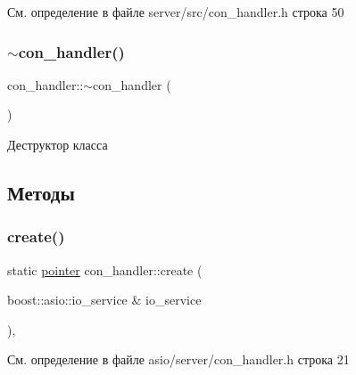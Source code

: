 См. определение в файле server/src/con\+\_\+handler.\+h строка 50

\mbox{\label{classcon__handler_aa1bc82c764eb633355a52bd77689ed3f}} 
\subsubsection{\texorpdfstring{$\sim$con\_handler()}{~con\_handler()}}
{\footnotesize\ttfamily con\+\_\+handler\+::$\sim$con\+\_\+handler (\begin{DoxyParamCaption}{ }\end{DoxyParamCaption})}



Деструктор класса 



\subsection{Методы}
\mbox{\label{classcon__handler_ab3cec40540ef3ff484ef0b639545eb17}} 
\subsubsection{\texorpdfstring{create()}{create()}\hspace{0.1cm}{\footnotesize\ttfamily [1/2]}}
{\footnotesize\ttfamily static \mbox{\hyperlink{classcon__handler_ada4a1b970f9fd8e55460a58cf7f7ce2c}{pointer}} con\+\_\+handler\+::create (\begin{DoxyParamCaption}\item[{boost\+::asio\+::io\+\_\+service \&}]{io\+\_\+service }\end{DoxyParamCaption})\hspace{0.3cm}{\ttfamily [inline]}, {\ttfamily [static]}}



См. определение в файле asio/server/con\+\_\+handler.\+h строка 21

\mbox{\label{classcon__handler_ab3cec40540ef3ff484ef0b639545eb17}} 
